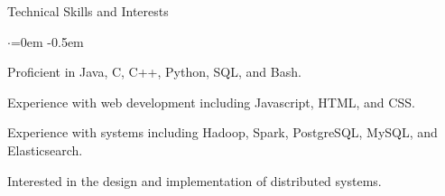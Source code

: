 \documentclass{resume} %
\begin{document}

\begin{rSection}{Technical Skills and Interests}

\begin{list}{$\cdot$}{\leftmargin=0em} %
\itemsep -0.5em %
\item Proficient in Java, C, C++, Python, SQL, and Bash.
\item Experience with web development including Javascript, HTML, and CSS.
\item Experience with systems including Hadoop, Spark, PostgreSQL, MySQL, and Elasticsearch.
\item Interested in the design and implementation of distributed systems.
\end{list}

\end{rSection}

\end{document}
